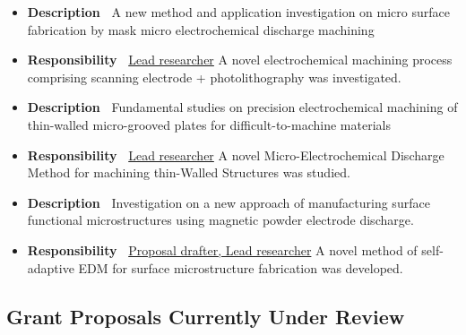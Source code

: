 \documentclass{resume}
\begin{document}
\label{NSFC2016}
\begin{itemize}[parsep=0.5ex]
  \item \textbf{Description~} A new method and application investigation on micro surface fabrication by mask micro electrochemical discharge machining
  \item \textbf{Responsibility~} \underline{Lead researcher} A novel electrochemical machining process comprising scanning electrode + photolithography was investigated.
\end{itemize}

\label{NSFCJoint}
\begin{itemize}[parsep=0.5ex]
  \item \textbf{Description~} Fundamental studies on precision electrochemical machining of thin-walled micro-grooved plates for difficult-to-machine materials
  \item \textbf{Responsibility~} \underline{Lead researcher} A novel Micro-Electrochemical Discharge Method for machining thin-Walled Structures was studied.
\end{itemize}

\label{NSFCMagnet}
\begin{itemize}[parsep=0.5ex]
  \item \textbf{Description~} Investigation on a new approach of manufacturing surface functional microstructures using magnetic powder electrode discharge.
  \item \textbf{Responsibility~} \underline{Proposal drafter, Lead researcher} A novel method of self-adaptive EDM for surface microstructure fabrication was developed.
\end{itemize}

\subsection{Grant Proposals Currently Under Review}

\end{document}
